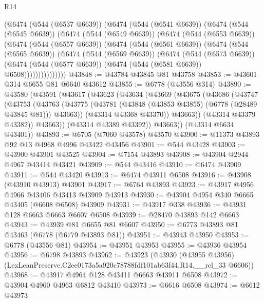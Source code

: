 \begin{lexlean}{R14}
\begin{coremodule}
          (@6474
            (@544 (@6537 @6639))
            (@6474
              (@544 (@6541 @6639))
              (@6474
                (@544 (@6545 @6639))
                (@6474
                  (@544 (@6549 @6639))
                  (@6474
                    (@544 (@6553 @6639))
                    (@6474
                      (@544 (@6557 @6639))
                      (@6474
                        (@544 (@6561 @6639))
                        (@6474
                          (@544 (@6565 @6639))
                          (@6474
                            (@544 (@6569 @6639))
                            (@6474
                              (@544 (@6573 @6639))
                              (@6474
                                (@544 (@6577 @6639))
                                (@6474 (@544 (@6581 @6639)) @6508)))))))))))))))
@43848 := @43784 @43845 @81 @43758
@43853 := @43601 @314 @6655 @81 @6640 @43612
@43855 := @6778 (@43556 @314)
@43890 := @43580
    (@43591
      (@43617
        (@43623
          (@43634
            (@43669
              (@43675
                (@43686
                  (@43747
                    (@43753
                      (@43763
                        (@43775
                          (@43781 (@43848 (@43853 @43855) (@6778 (@28489 @43845 @81))) @43663))
                        (@43314 @43368 @43370))
                      @43663))
                  (@43314 @43379 @43382))
                @43663))
            (@43314 @43389 @43392))
          @43663))
      (@43314 @6634 @43401))
@43893 := @6705 (@7060 @43578) @43570
@43900 := @11373 @43893 @92 @13 @4968 @4996 @43422 @43456
@43901 := @544 @43428
@43903 := @43900 @43901 @43525
@43904 := @7154 @43893
@43908 := @43904 @2944 @4967 @43414 @43421
@43909 := @544 @43416
@43910 := @6474 @43909
@43911 := @544 @43420
@43913 := @6474 @43911 @6508
@43916 := @43908 (@43910 @43913) @43901
@43917 := @6764 @43893
@43923 := @43917 @4956 @4966 @43406 @43413 @43909 @43913
@43930 := @43904 @4954 @340 @6665 @43405 (@6608 @6508) @43909
@43931 := @43917 @338
@43936 := @43931 @128 @6663 @6663 @6607 @6508
@43939 := @28470 @43893 @142 @6663
@43943 := @43939 @81 @6655 @81 @6607
@43950 := @6773 @43893 @81 @43463 (@6778 (@6779 @43893 @81))
@43951 := @43943 @43950
@43953 := @6778 (@43556 @81)
@43954 := @43951 @43953
@43955 := @43936 @43954
@43956 := @6798 @43893
@43962 := @43923
    (@43930 (@43955 @43956) (LexLeanPreserve.C2ee0173a5a920c78788fdf101ab63f44.R14.__rel_33 @6606))
@43968 := @43917 @4964 @128 @43411 @6663 @43911 @6508
@43972 := @43904 @4960 @4963 @6812 @43410
@43973 := @6616 @6508
@43974 := @6612 @43973

\end{coremodule}
\end{lexlean}

